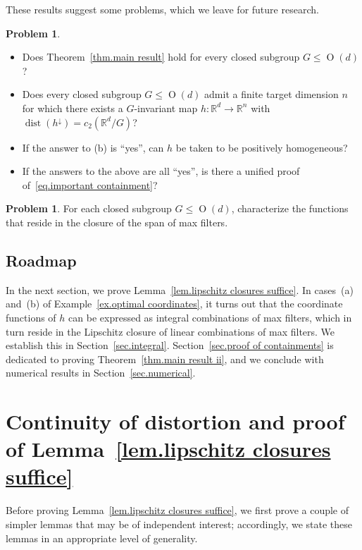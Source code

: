 \documentclass{article}
\theoremstyle{plain}
\theoremstyle{definition}
\newtheorem{problem}[theorem]{Problem}
\begin{document}
These results suggest some problems, which we leave for future research.
\begin{problem}
\label{problem.first problem}
~
\begin{itemize}
\item[(a)] 
Does Theorem~\ref{thm.main result} hold for every closed subgroup $G \leq \operatorname{O}(d)$?
\item[(b)]
Does every closed subgroup $G \leq \operatorname{O}(d)$ admit a finite target dimension $n$ for which there exists a $G$-invariant map $h \colon \mathbb{R}^d \to \mathbb{R}^n$ with $\operatorname{dist}(h^{\downarrow})=c_2(\mathbb{R}^d/G)$?
\item[(c)]
If the answer to (b) is ``yes'', can $h$ be taken to be positively homogeneous?
\item[(d)]
If the answers to the above are all ``yes'', is there a unified proof of~\eqref{eq.important containment}?
\end{itemize}
\end{problem}

\begin{problem}
For each closed subgroup $G\leq\operatorname{O}(d)$, characterize the functions that reside in the closure of the span of max filters.
\end{problem}

\subsection{Roadmap}

In the next section, we prove Lemma~\ref{lem.lipschitz closures suffice}.
In cases~(a) and~(b) of Example~\ref{ex.optimal coordinates}, it turns out that the coordinate functions of $h$ can be expressed as integral combinations of max filters, which in turn reside in the Lipschitz closure of linear combinations of max filters.
We establish this in Section~\ref{sec.integral}.
Section~\ref{sec.proof of containments} is dedicated to proving Theorem~\ref{thm.main result ii}, and we conclude with numerical results in Section~\ref{sec.numerical}.

\section{Continuity of distortion and proof of Lemma~\ref{lem.lipschitz closures suffice} }
\label{sec.proof of key lemma}

Before proving Lemma~\ref{lem.lipschitz closures suffice}, we first prove a couple of simpler lemmas that may be of independent interest; accordingly, we state these lemmas in an appropriate level of generality.
\end{document}
